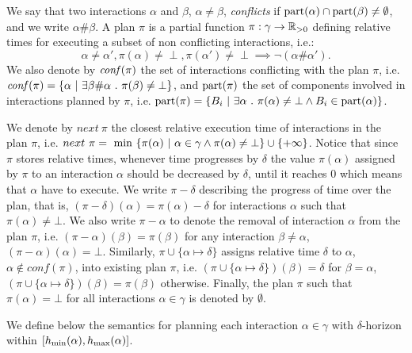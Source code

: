 \begin{definition}[Plan]\label{def:plan}
We say that two interactions $\alpha$ and $\beta$, $\alpha \neq \beta$, \emph{conflicts} if $\mathrm{part}(\alpha)\cap\mathrm{part}(\beta)\neq\emptyset$, and we write $\alpha\#\beta$.
A plan $\pi$ is a partial function $\pi:\gamma \to\mathbb R_{> 0}$ defining relative times for 
executing a subset of non conflicting interactions, i.e.:
\begin{displaymath}
  \alpha\neq\alpha',\pi(\alpha)\neq\perp,\pi(\alpha')\neq\perp\implies \neg(\alpha\#\alpha').
\end{displaymath}
We also denote by $\mathit{conf}(\pi)$ the set of interactions conflicting with the plan $\pi$, i.e. $\mathit{conf}(\pi) = \{ \alpha \ | \ \exists \beta \# \alpha \ . \ \pi (\beta) \neq \bot \}$, and $\mathrm{part}(\pi)$ the set of components involved in interactions planned by $\pi$, i.e. $\p{\pi} = \{ B_i \ | \ \exists \alpha \ . \ \pi(\alpha) \neq \bot \wedge B_i \in \p{\alpha} \}$.
\end{definition}
We denote by $next \ \pi$ the closest relative execution time of interactions in the plan $\pi$, i.e. $next \ \pi = \textnormal{ min } \{ \pi(\alpha) \ | \ \alpha \in \gamma \wedge \pi(\alpha) \neq \bot \} \cup \{ +\infty \}$.
Notice that since $\pi$ stores relative times, whenever time progresses by $\delta$ the value $\pi(\alpha)$ assigned by $\pi$ to an interaction $\alpha$ should be decreased by $\delta$, until it reaches $0$ which means that $\alpha$ have to execute.
We write $\pi-\delta$ describing the progress of time 
over the plan, that is, $(\pi-\delta)(\alpha) = \pi(\alpha) - \delta$ for interactions $\alpha$ such that $\pi(\alpha) \neq \bot$.
We also write
$\pi-\alpha$ to denote the removal of interaction $\alpha$ from the plan $\pi$, i.e. $(\pi-\alpha)(\beta) = \pi(\beta)$ for any interaction $\beta \neq \alpha$, $(\pi-\alpha)(\alpha) = \bot$.
Similarly, $\pi \cup \{ \alpha \mapsto \delta \}$ assigns relative time $\delta$ to $\alpha$, $\alpha \notin conf(\pi)$, into existing plan $\pi$, i.e. $(\pi \cup \{ \alpha \mapsto \delta \})(\beta) = \delta$ for $\beta = \alpha$, $(\pi \cup \{ \alpha \mapsto \delta \})(\beta) = \pi(\beta)$ otherwise.
Finally, the plan $\pi$ such that $\pi(\alpha) = \bot$ for all interactions $\alpha \in \gamma$ is denoted by $\emptyset$.

We define below the semantics for planning each interaction $\alpha\in\gamma$ with $\delta$-horizon within $[h_{\min}(\alpha),h_{\max}(\alpha)]$.

